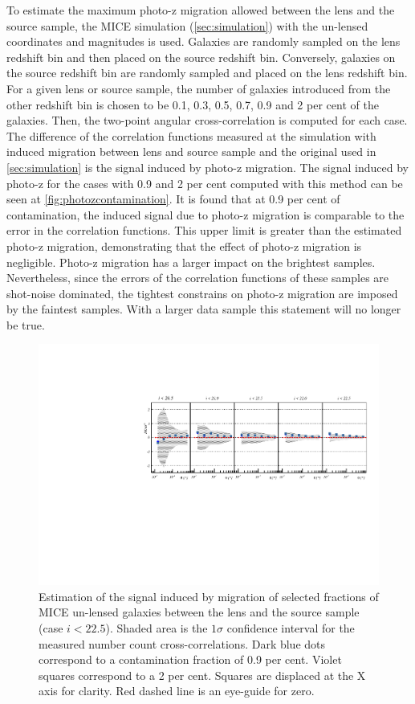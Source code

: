 To estimate the maximum photo-z migration allowed between the lens and the source sample, the MICE simulation (\autoref{sec:simulation}) with the un-lensed coordinates and magnitudes is used. Galaxies are randomly sampled on the lens redshift bin and then placed on the source redshift bin. Conversely, galaxies on the source redshift bin are randomly sampled and placed on the lens redshift bin. For a given lens or source sample, the number of galaxies introduced from the other redshift bin is chosen to be 0.1, 0.3, 0.5, 0.7, 0.9 and 2 per cent of the galaxies. Then, the two-point angular cross-correlation is computed for each case. The difference of the correlation functions measured at the simulation with induced migration between lens and source sample and the original used in \autoref{sec:simulation} is the signal induced by photo-z migration. The signal induced by photo-z for the cases with 0.9 and 2 per cent computed with this method can be seen at \autoref{fig:photozcontamination}. It is found that  at 0.9 per cent of contamination, the induced signal due to photo-z migration is comparable to the error in the correlation functions. This upper limit is greater than the estimated photo-z migration, demonstrating that the effect of photo-z migration is negligible. Photo-z migration has a larger impact on the brightest samples. Nevertheless, since the errors of the correlation functions of these samples are shot-noise dominated, the tightest constrains on photo-z migration are imposed by the faintest samples. With a larger data sample this statement will no longer be true.
\begin{figure}
\includegraphics[width=\textwidth,trim={0 2.3cm 0 3.5cm},clip]{./figures/mag_i_mix.pdf}
\caption{Estimation of the signal induced by migration of selected fractions of MICE un-lensed galaxies between the lens and the source sample (case $i<22.5$). Shaded area is the $1\sigma$ confidence interval for the measured number count cross-correlations. Dark blue dots correspond to a contamination fraction of 0.9 per cent. Violet squares correspond to a 2 per cent. Squares are displaced at the X axis for clarity. Red dashed line is an eye-guide for zero.}
\label{fig:photozcontamination}
\end{figure}
\newline

